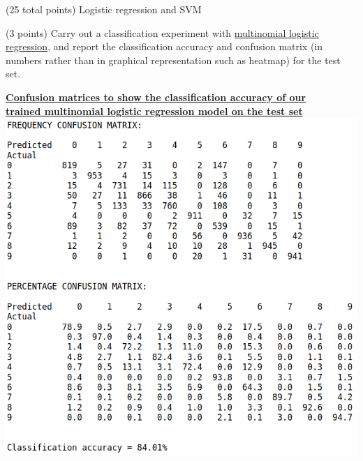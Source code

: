 \documentclass[12pt]{article}
\begin{document}
\clearpage
%
%
\begin{question}{(25 total points) Logistic regression and SVM}

  


  \medskip
   \begin{subquestion}{(3 points)
       Carry out a classification experiment with
       \href{https://scikit-learn.org/0.19/modules/generated/sklearn.linear\_model.LogisticRegression.html}{multinomial logistic regression},
       and report the classification accuracy and confusion matrix (in
       numbers rather than in graphical representation such as heatmap)
       for the test set.
     } \label{Q2.1}


   

      \begin{answerbox}{40em}
        \begin{center}
        \textbf{\underline{\large{Confusion matrices to show the classification accuracy of our}}}\\
        \textbf{\underline{\large{trained multinomial logistic regression model on the test set}}}
        \vspace{0.3cm}\\
         \includegraphics[width=1\textwidth]{images/q21.png}
        \end{center}
      \end{answerbox}
  



\end{subquestion}
\end{question}
\end{document}
